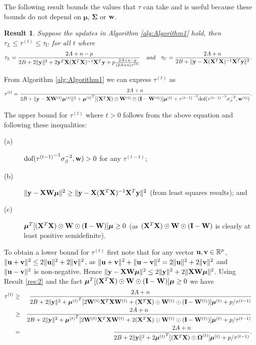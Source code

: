 \documentclass[11pt]{article}
\newtheorem{Result}{Result}
\newtheorem{Main Result}{Main Result}
\def\vectorfontone{\bf}
\def\vectorfonttwo{\boldsymbol}
\def\vu{{\vectorfontone u}}                      %
\def\vv{{\vectorfontone v}}                      %
\def\vw{{\vectorfontone w}}                      %
\def\vy{{\vectorfontone y}}                      %
\def\vmu{{\vectorfonttwo \mu}}                   %
\def\matrixfontone{\bf}
\def\matrixfonttwo{\boldsymbol}
\def\mI{{\matrixfontone I}}                      %
\def\mW{{\matrixfontone W}}                      %
\def\mX{{\matrixfontone X}}                      %
\def\mSigma{{\matrixfonttwo \Sigma}}             %
\def\mOmega{{\matrixfonttwo \Omega}}             %
\newcommand{\cyc}[1]{{\color{black}#1}}
\begin{document}
\smallskip
\noindent The following result bounds the values that $\tau$ can take and is
useful because these bounds do not depend on $\vmu$, $\mSigma$ or $\vw$.
\cyc{
	\begin{Result}\label{res:3}
		Suppose the updates in Algorithm \ref{alg:Algorithm1} hold, then $\tau_L \le \tau^{(t)} \le \tau_U$ for all $t$
		where
		$$
		\tau_L = \frac{2A + n -p }{
			2B + 2\|\vy\|^2 + 2\vy^T\mX(\mX^T\mX)^{-1}\mX^T\vy + p\frac{2A + n -p}{(2A + n)\tau^{(0)}}}
		\quad\mbox{\it and} \quad
		\tau_U = \frac{2A + n}{2B + \|\vy - \mX(\mX^T\mX)^{-1}\mX^T\vy\|^2}.
		$$
		
	\end{Result}
	
	\noindent {\bf Proof of Result \ref{res:3}:} From Algorithm \ref{alg:Algorithm1} we can express $\tau^{(t)}$ as
	$$
	\tau^{(t)} = \frac{ 2A + n }{ 2B
		+ \|\vy - \mX\mW^{(t)}\vmu^{(t)}\|^2
		+ {\vmu^{(t)}}^T[(\mX^T\mX)\odot\mW^{(t)}\odot(\mI - \mW^{(t)})]\vmu^{(t)}
		+ {\tau^{(t-1)}}^{-1}\mbox{dof}({\tau^{(t-1)}}^{-1}\sigma_\beta^{-2},\vw^{(t)})}.
	$$
	
	\noindent The upper bound for $\tau^{(t)}$ where $t>0$ follows from the above equation and following these inequalities:
	\begin{description}
		\item[(a)] $\mbox{dof}({\tau^{(t-1)}}^{-1}\sigma_\beta^{-2},\vw)> 0$ for any $\tau^{(t-1)}$;
		\item[(b)] $\|\vy - \mX\mW\vmu\|^2 \ge \|\vy - \mX(\mX^T\mX)^{-1}\mX^T\vy\|^2$
		(from least squares results); and
		\item[(c)] $\vmu^T[(\mX^T\mX)\odot\mW\odot(\mI - \mW)]\vmu\ge 0$ (as $(\mX^T\mX)\odot\mW\odot(\mI - \mW)$ is clearly at least positive semidefinite).
	\end{description}
	
	To obtain a lower bound for $\tau^{(t)}$ first note that for any vector $\vu,\vv\in \mathbb{R}^p$, $\|\vu+\vv\|^2\leq 2\|\vu\|^2+2\|\vv\|^2$, as $\|\vu+\vv\|^2+\|\vu-\vv\|^2=2\|\vu\|^2+2\|\vv\|^2$ and $\|\vu-\vv\|^2$ is non-negative. Hence
	$\|\vy - \mX\mW\vmu\|^2 \le 2\|\vy\|^2 + 2\|\mX\mW\vmu\|^2$. Using Result \ref{res:2} and the fact $\vmu^{T}[(\mX^{T}\mX)\odot\mW\odot(\mI - \mW)]\vmu\ge 0$ we have
	\begin{eqnarray*}
		\tau^{(t)} &\ge& \frac{2A + n }{
			2B + 2\|\vy\|^2 + {\vmu^{(t)}}^T[2\mW^{(t)}\mX^T\mX\mW^{(t)}+(\mX^T\mX)\odot\mW^{(t)}\odot(\mI-\mW^{(t)})]\vmu^{(t)} + p/\tau^{(t-1)}}\\
		&\ge&\frac{2A + n}{
			2B + 2\|\vy\|^2 + {\vmu^{(t)}}^T[2\mW^{(t)}\mX^T\mX\mW^{(t)}+2(\mX^T\mX)\odot\mW^{(t)}\odot(\mI-\mW^{(t)})]\vmu^{(t)}
			+ p/\tau^{(t-1)}}\\
		&=&\frac{2A + n}{
			2B + 2\|\vy\|^2 + 2{\vmu^{(t)}}^T[(\mX^T\mX)\odot\mOmega^{(t)}]\vmu^{(t)} + p/\tau^{(t-1)}}.
	\end{eqnarray*}
	
}
\end{document}
